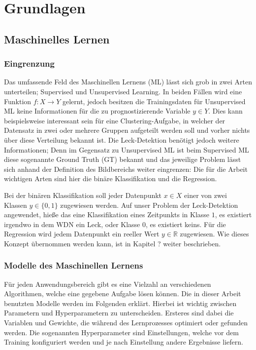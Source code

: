 \chapter{Grundlagen}

\section{Maschinelles Lernen}

\subsection*{Eingrenzung}

Das umfassende Feld des Maschinellen Lernens (ML) lässt sich grob in zwei Arten unterteilen;
 Supervised und Unsupervised Learning. In beiden Fällen wird eine Funktion $f: X \rightarrow Y$ gelernt,
 jedoch besitzen die Trainingsdaten für Unsupervised ML keine Informationen für die zu prognostizierende
 Variable $y \in Y$. Dies kann beispielsweise interessant sein für eine Clustering-Aufgabe, in welcher der
 Datensatz in zwei oder mehrere Gruppen aufgeteilt werden soll und vorher nichts über diese Verteilung bekannt
 ist. Die Leck-Detektion benötigt jedoch weitere Informationen; Denn im Gegensatz zu Unsupervised ML ist beim
 Supervised ML diese sogenannte Ground Truth (GT) bekannt und das jeweilige Problem lässt sich anhand der
 Definition des Bildbereichs weiter eingrenzen: Die für die Arbeit wichtigen Arten sind hier die binäre
 Klassifikation und die Regression.

Bei der binären Klassifikation soll jeder Datenpunkt $x \in X$ einer von zwei Klassen $y \in \{0, 1\}$ zugewiesen
 werden. Auf unser Problem der Leck-Detektion angewendet, hieße das eine Klassifikation eines Zeitpunkts in
 Klasse $1$, es existiert irgendwo in dem WDN ein Leck, oder Klasse $0$, es existiert keins. Für die Regression
 wird jedem Datenpunkt ein reeller Wert $y \in \mathbb{R}$ zugewiesen. Wie dieses Konzept übernommen werden
 kann, ist in Kapitel ? weiter beschrieben. 


\subsection*{Modelle des Maschinellen Lernens}

Für jeden Anwendungsbereich gibt es eine Vielzahl an verschiedenen Algorithmen, welche eine gegebene Aufgabe
 lösen können. Die in dieser Arbeit benutzten Modelle werden im Folgenden erklärt. Hierbei ist wichtig zwischen
 Parametern und Hyperparametern zu unterscheiden. Ersteres sind dabei die Variablen und Gewichte, die während
 des Lernprozesses optimiert oder gefunden werden. Die sogenannten Hyperparameter sind Einstellungen, welche
 vor dem Training konfiguriert werden und je nach Einstellung andere Ergebnisse liefern.

